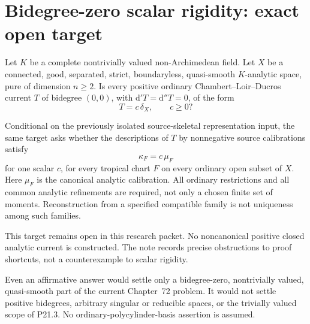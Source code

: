 \section*{Bidegree-zero scalar rigidity: exact open target}

Let \(K\) be a complete nontrivially valued non-Archimedean field.
Let \(X\) be a connected, good, separated, strict, boundaryless,
quasi-smooth \(K\)-analytic space, pure of dimension \(n\geq2\).
Is every positive ordinary Chambert--Loir--Ducros current \(T\) of
bidegree \((0,0)\), with
\(\mathrm d'T=\mathrm d''T=0\), of the form
\[
                         T=c\,\delta_X,\qquad c\geq0?
\]

Conditional on the previously isolated source-skeletal representation
input, the same target asks whether the descriptions of \(T\) by
nonnegative source calibrations satisfy
\[
       \kappa_F=c\,\mu_F
\]
for one scalar \(c\), for every tropical chart \(F\) on every ordinary
open subset of \(X\). Here \(\mu_F\) is the canonical analytic
calibration. All ordinary restrictions and all common analytic
refinements are required, not only a chosen finite set of moments.
Reconstruction from a specified compatible family is not uniqueness
among such families.

This target remains open in this research packet. No noncanonical
positive closed analytic current is constructed. The note records
precise obstructions to proof shortcuts, not a counterexample to
scalar rigidity.

Even an affirmative answer would settle only a bidegree-zero,
nontrivially valued, quasi-smooth part of the current Chapter~72
problem. It would not settle positive bidegrees, arbitrary singular
or reducible spaces, or the trivially valued scope of P21.3.
No ordinary-polycylinder-basis assertion is assumed.

